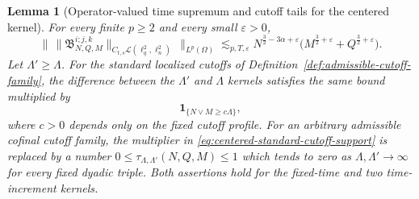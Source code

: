 \documentclass[10pt]{amsart}
\numberwithin{equation}{section}
\theoremstyle{plain}
\newtheorem{lemma}[theorem]{Lemma}
\theoremstyle{definition}
\theoremstyle{remark}
\newcommand{\eps}{\varepsilon}
\begin{document}
\begin{lemma}[Operator-valued time supremum and cutoff tails for the centered kernel]\label{lem:time-sup-centered-kernel}
For every finite $p\ge2$ and every small $\eps>0$,
\begin{equation}\label{eq:time-sup-centered-kernel}
 \bigl\|\,\|\mathfrak B_{N,Q,M}^{i;j,k}\|_{C_{t,s}\mathcal L(\ell^2_q,\ell^2_n)}\,\bigr\|_{L^p(\Omega)}
 \lesssim_{p,T,\eps}
 N^{\frac32-3\alpha+\eps}\bigl(M^{\frac32+\eps}+Q^{\frac32+\eps}\bigr).
\end{equation}
Let $\Lambda'\ge\Lambda$.  For the standard localized cutoffs of Definition~\ref{def:admissible-cutoff-family}, the difference between the $\Lambda'$ and $\Lambda$ kernels satisfies the same bound multiplied by
\begin{equation}\label{eq:centered-standard-cutoff-support}
        \mathbf 1_{\{N\vee M\ge c\Lambda\}},
\end{equation}
where $c>0$ depends only on the fixed cutoff profile.  For an arbitrary admissible cofinal cutoff family, the multiplier in \eqref{eq:centered-standard-cutoff-support} is replaced by a number
$0\le\tau_{\Lambda,\Lambda'}(N,Q,M)\le1$ which tends to zero as $\Lambda,\Lambda'\to\infty$ for every fixed dyadic triple.  Both assertions hold for the fixed-time and two time-increment kernels.
\end{lemma}
\end{document}
